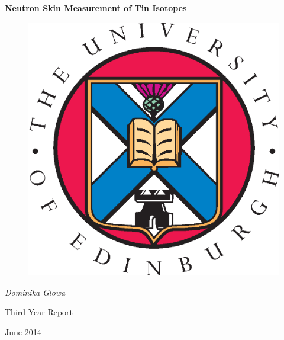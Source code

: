 \pagestyle{empty}

\begin{center}
\LARGE
{\bf Neutron Skin Measurement of Tin Isotopes}

\vspace{1cm}

\begin{figure}[ht]
\begin{center}
\includegraphics[scale=0.4]{crest.eps}
\end{center}
\end{figure}

\large
{\it Dominika Glowa}

\vspace{2cm}
\normalsize
Third Year Report\

June 2014
\end{center}

